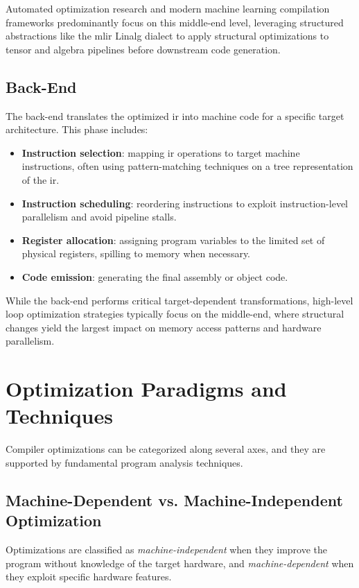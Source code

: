 Automated optimization research and modern machine learning compilation frameworks predominantly focus on this middle-end level, leveraging structured abstractions like the \gls{mlir} Linalg dialect to apply structural optimizations to tensor and algebra pipelines before downstream code generation.

\newpage
\subsection{Back-End}

The back-end translates the optimized \gls{ir} into machine code for a specific target architecture. This phase includes:

\begin{itemize}
    \item \textbf{Instruction selection}: mapping \gls{ir} operations to target machine instructions, often using pattern-matching techniques on a tree representation of the \gls{ir}.
    \item \textbf{Instruction scheduling}: reordering instructions to exploit instruction-level parallelism and avoid pipeline stalls.
    \item \textbf{Register allocation}: assigning program variables to the limited set of physical registers, spilling to memory when necessary.
    \item \textbf{Code emission}: generating the final assembly or object code.
\end{itemize}

While the back-end performs critical target-dependent transformations, high-level loop optimization strategies typically focus on the middle-end, where structural changes yield the largest impact on memory access patterns and hardware parallelism.

\section{Optimization Paradigms and Techniques}
\label{sec:opt-paradigms}

Compiler optimizations can be categorized along several axes, and they are supported by fundamental program analysis techniques.

\subsection{Machine-Dependent vs. Machine-Independent Optimization}

Optimizations are classified as \textit{machine-independent} when they improve the program without knowledge of the target hardware, and \textit{machine-dependent} when they exploit specific hardware features.

